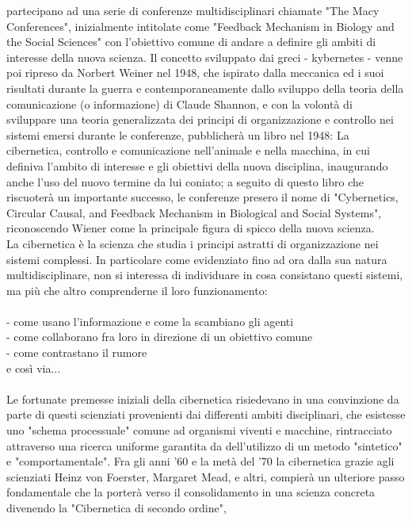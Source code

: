 partecipano ad una serie di conferenze
multidisciplinari chiamate "The Macy Conferences", inizialmente intitolate come
"Feedback Mechanism in Biology and the Social Sciences"
con l'obiettivo comune di andare a definire
gli ambiti di interesse della nuova scienza.
Il concetto sviluppato dai greci - kybernetes -
venne poi ripreso da Norbert Weiner nel 1948,
che ispirato dalla meccanica ed i suoi risultati durante la guerra
e contemporaneamente dallo sviluppo della teoria della comunicazione
(o informazione) di Claude Shannon,
e con la volontà di sviluppare una teoria generalizzata dei principi di
organizzazione e controllo nei sistemi emersi durante le conferenze,
pubblicherà un libro nel 1948:
La cibernetica, controllo e comunicazione nell'animale e nella macchina,
in cui definiva l'ambito di interesse e gli obiettivi della nuova disciplina,
inaugurando anche l'uso del nuovo termine da lui coniato;
a seguito di questo libro che riscuoterà
un importante successo, le conferenze presero il nome di
"Cybernetics, Circular Causal, and Feedback Mechanism in Biological and Social Systems",
riconoscendo Wiener come la principale figura di spicco della nuova scienza.
\\
La cibernetica è la scienza che studia i principi astratti di organizzazione
nei sistemi complessi.
In particolare come evidenziato fino ad ora dalla sua natura multidisciplinare,
non si interessa di individuare in cosa consistano questi sistemi,
ma più che altro comprenderne il loro funzionamento:
\\ \\
- come usano l'informazione e come la scambiano gli agenti
\\
- come collaborano fra loro in direzione di un obiettivo comune
\\
- come contrastano il rumore
\\
  e così via...
\\ \\
Le fortunate premesse iniziali della cibernetica risiedevano in una convinzione
da parte di questi scienziati provenienti dai differenti ambiti disciplinari,
che esistesse uno
"schema processuale" comune ad organismi viventi e macchine,
rintracciato attraverso una ricerca uniforme garantita da dell'utilizzo di un metodo
"sintetico" e "comportamentale".
Fra gli anni '60 e la metà del '70 la cibernetica grazie agli scienziati
Heinz von Foerster, Margaret Mead, e altri,
compierà un ulteriore passo fondamentale che la porterà
verso il consolidamento in una scienza concreta
divenendo la "Cibernetica di secondo ordine",
